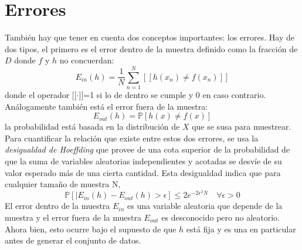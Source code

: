 \section{Errores}
También hay que tener en cuenta dos conceptos importantes: los errores. Hay de dos tipos, el primero es el error dentro de la muestra definido como la fracción de $D$ donde $f$ y $h$ no concuerdan:
\[E_{in}(h) = \frac{1}{N}\sum_{n=1}^{N}[[h(x_{n}) \neq f(x_{n})]]\]
donde el operador [[$\cdot$]]=1 si lo de dentro se cumple y 0 en caso contrario. Análogamente también está el error fuera de la muestra:
\[ E_{out}(h)=\mathbb{P}[h(x) \neq f(x)] \]
la probabilidad está basada en la distribución de $X$ que se susa para muestrear.\\
Para cuantificar la relación que existe entre estos dos errores, se usa la \textit{desigualdad de Hoeffding} que provee de una cota superior de la probabilidad de que la suma de variables aleatorias independientes y acotadas se desvíe de su valor esperado más de una cierta cantidad. Esta desigualdad indica que para cualquier tamaño de muestra N,
\[ \mathbb{P}[\vert E_{in}(h)-E_{out}(h) > \epsilon] \leq  2e^{-2\epsilon^{2}N} \quad \forall \epsilon > 0 \]
El error dentro de la muestra $E_{in}$ es una variable aleatoria que depende de la muestra y el error fuera de la muestra $E_{out}$ es desconocido pero no aleatorio. Ahora bien, esto ocurre bajo el supuesto de que $h$ está fija y es una en particular antes de generar el conjunto de datos. \cite{abu2012learning}
